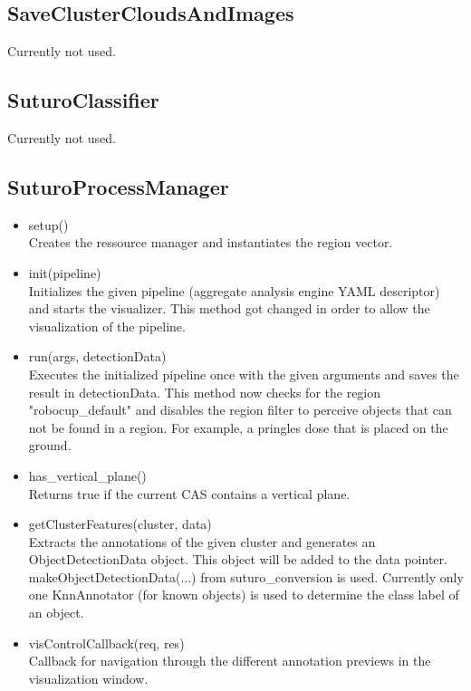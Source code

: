 \documentclass[main.tex]{subfiles}
\begin{document}
\subsection{SaveClusterCloudsAndImages}
Currently not used.

\subsection{SuturoClassifier}
Currently not used.

\subsection{SuturoProcessManager}
\begin{itemize}
\item setup()\\
Creates the ressource manager and instantiates the region vector.

\item init(pipeline)\\
Initializes the given pipeline (aggregate analysis engine YAML descriptor) and starts the visualizer.
This method got changed in order to allow the visualization of the pipeline.

\item run(args, detectionData)\\
Executes the initialized pipeline once with the given arguments and saves the result in detectionData.
This method now checks for the region "robocup\_default" and disables the region filter to perceive objects that can not be found
in a region. For example, a pringles dose that is placed on the ground.

\item has\_vertical\_plane()\\
Returns true if the current CAS contains a vertical plane.

\item getClusterFeatures(cluster, data)\\
Extracts the annotations of the given cluster and generates an ObjectDetectionData object. 
This object will be added to the data pointer. makeObjectDetectionData(...) from suturo\_conversion is used.
Currently only one KnnAnnotator (for known objects) is used to determine the class label of an object.

\item visControlCallback(req, res)\\
Callback for navigation through the different annotation previews in the visualization window.
\end{itemize}
\end{document}
